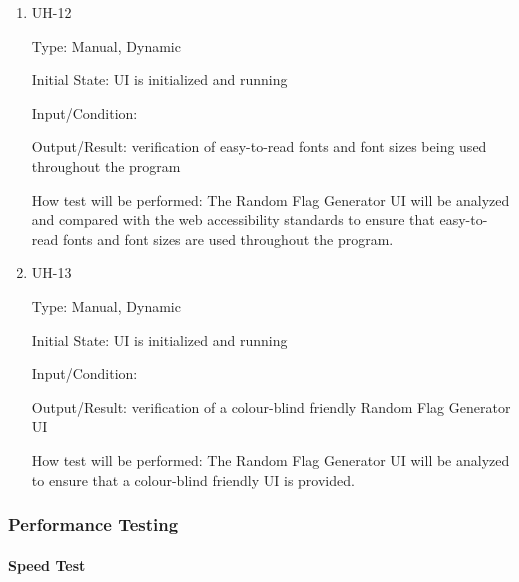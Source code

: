 \documentclass[12pt, titlepage]{article}
\begin{document}
\begin{enumerate}

\item{UH-12\\}

Type: Manual, Dynamic

Initial State: UI is initialized and running

Input/Condition: 

Output/Result: verification of easy-to-read fonts and font sizes being used
throughout the program

How test will be performed: The Random Flag Generator UI will be analyzed and
compared with the web accessibility standards to ensure that easy-to-read
fonts and font sizes are used throughout the program.

\item{UH-13\\}

Type: Manual, Dynamic

Initial State: UI is initialized and running

Input/Condition: 

Output/Result: verification of a colour-blind friendly Random Flag Generator
UI

How test will be performed: The Random Flag Generator UI will be analyzed to
ensure that a colour-blind friendly UI is provided.

\end{enumerate}

\subsubsection{Performance Testing}

\paragraph{Speed Test}
\end{document}
